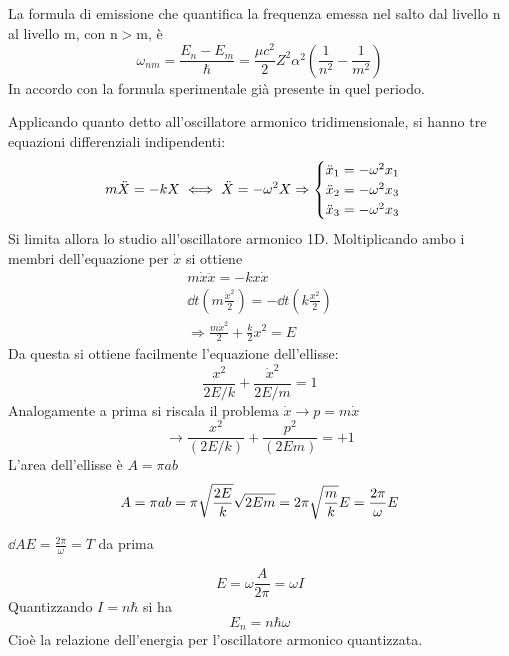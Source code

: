 \documentclass[Main.tex]{subfiles}
\begin{document}

La formula di emissione che quantifica la frequenza emessa nel salto dal livello n al livello m, con n$>$m, è 
\begin{equation}
	\omega_{nm} = \frac{E_n-E_m}{\hbar} = \frac{\mu c^2}{2} Z^2 \alpha^2 \left( \frac{1}{n^2} - \frac{1}{m^2} \right)
\end{equation}
In accordo con la formula sperimentale già presente in quel periodo.

\newpage
\begin{tema}
	Applicando quanto detto all'oscillatore armonico tridimensionale, si hanno tre equazioni differenziali indipendenti:
\begin{equation}\notag
	m\ddot X = -k X \iff \ddot X= - \omega^2 X \Rightarrow \begin{cases}
 \ddot x_1 = -\omega^2 x_1\\
 \ddot x_2 = -\omega^2 x_3\\
 \ddot x_3 = -\omega^2 x_3	
 \end{cases}
\end{equation}
Si limita allora lo studio all'oscillatore armonico 1D. Moltiplicando ambo i membri dell'equazione per $\dot x$ si ottiene
\begin{gather}
m \dot x \ddot x = - k x \dot x\\
\dd{}{t} \left(m \frac{\dot x^2}{2} \right) = - \dd{}{t} \left(k \frac{x^2}{2} \right)\\
	\Rightarrow \boxed{ \frac{m \dot x^2}{2} + \frac{k}{2}x^2 =E}
\end{gather}
Da questa si ottiene facilmente l'equazione dell'ellisse:
\begin{equation}
	\frac{x^2}{2E/k} + \frac{\dot x^2}{2E/m}=1
\end{equation}
Analogamente a prima si riscala il problema $\dot x \rightarrow p =m \dot x$
\begin{equation}
	\rightarrow \frac{x^2}{(2E/k)} + \frac{p^2}{(2E m)}=+1
\end{equation}
L'area dell'ellisse è $A= \pi ab$
\begin{equation}\notag
	A= \pi ab = \pi \sqrt{\frac{2E}{k}} \sqrt{2Em} = 2 \pi \sqrt{\frac{m}{k}}E= \frac{2 \pi}{\omega} E
\end{equation}
\newpage
\begin{osservazione}
	$\dd{A}{E}= \frac{2 \pi}{\omega}=T$ da prima
\end{osservazione}
\begin{equation}
	E= \omega \frac{A}{2 \pi} = \omega I
\end{equation}
Quantizzando $I= n \hbar$ si ha
\begin{equation}
	\boxed{E_n = n \hbar \omega}
\end{equation}
Cioè la relazione dell'energia per l'oscillatore armonico quantizzata.
\end{tema}
\end{document}
